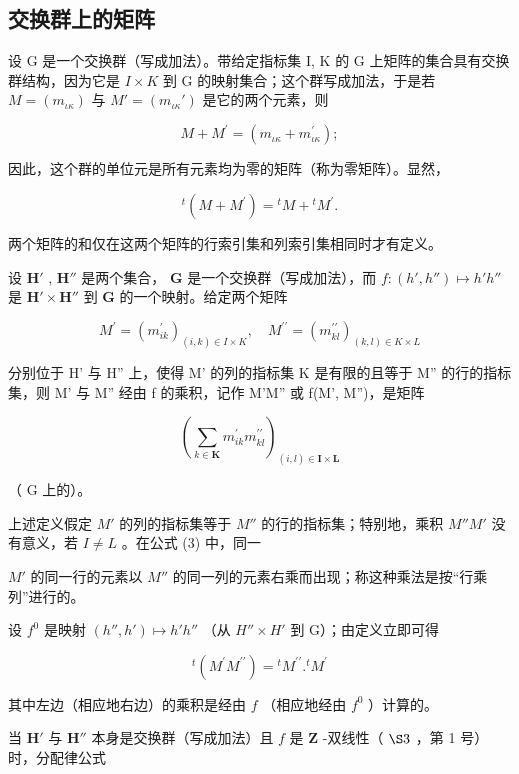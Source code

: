 \subsection{交换群上的矩阵}

设 G 是一个交换群（写成加法）。带给定指标集 I, K 的 G 上矩阵的集合具有交换群结构，因为它是 \(I \times K\) 到 G 的映射集合；这个群写成加法，于是若 \(M = (m_{\iota\kappa})\) 与 \(M' = (m_{\iota\kappa}')\) 是它的两个元素，则

\[
M + M ^ {\prime} = (m _ {\iota \kappa} + m _ {\iota \kappa} ^ {\prime});
\]

因此，这个群的单位元是所有元素均为零的矩阵（称为零矩阵）。显然，

\[
{ } ^ { t } ( M + M ^ { \prime } ) = { } ^ { t } M + { } ^ { t } M ^ { \prime } .\tag{2}
\]

两个矩阵的和仅在这两个矩阵的行索引集和列索引集相同时才有定义。

设 \(\mathbf{H}'\) , \(\mathbf{H}''\) 是两个集合， \(\mathbf{G}\) 是一个交换群（写成加法），而 \(f: (h', h'') \mapsto h'h''\) 是 \(\mathbf{H}' \times \mathbf{H}''\) 到 \(\mathbf{G}\) 的一个映射。给定两个矩阵

\[
M ^ {\prime} = \left(m _ {i k} ^ {\prime}\right) _ {(i, k) \in I \times K}, \quad M ^ {\prime \prime} = \left(m _ {k l} ^ {\prime \prime}\right) _ {(k, l) \in K \times L}
\]

分别位于 H' 与 H'' 上，使得 M' 的列的指标集 K 是有限的且等于 M'' 的行的指标集，则 M' 与 M'' 经由 f 的乘积，记作 M'M'' 或 f(M', M'')，是矩阵

\[
\left(\sum_ {k \in \mathbf {K}} m _ {i k} ^ {\prime} m _ {k l} ^ {\prime \prime}\right) _ {(i, l) \in \mathbf {I} \times \mathbf {L}}\tag{3}
\]

（ G 上的）。

上述定义假定 \(M'\) 的列的指标集等于 \(M''\) 的行的指标集；特别地，乘积 \(M''M'\) 没有意义，若 \(I \neq L\) 。在公式 (3) 中，同一

 \(M'\) 的同一行的元素以 \(M''\) 的同一列的元素右乘而出现；称这种乘法是按“行乘列”进行的。

设 \(f^0\) 是映射 \((h'', h') \mapsto h'h''\) （从 \(H'' \times H'\) 到 G）；由定义立即可得

\[
{ } ^ { t } ( M ^ { \prime } M ^ { \prime \prime } ) = { } ^ { t } M ^ { \prime \prime } . { } ^ { t } M ^ { \prime }\tag{4}
\]

其中左边（相应地右边）的乘积是经由 \(f\) （相应地经由 \(f^0\) ）计算的。

当 \(\mathbf{H}'\) 与 \(\mathbf{H}''\) 本身是交换群（写成加法）且 \(f\) 是 \(\mathbf{Z}\) -双线性（ \(\S 3\) ，第 1 号）时，分配律公式

